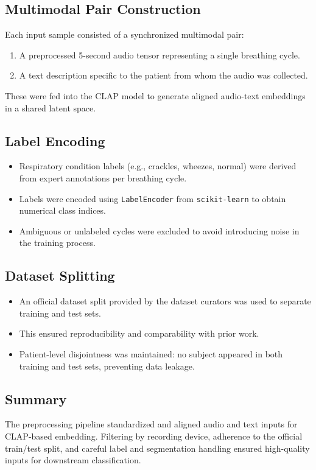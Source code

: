 \subsection{Multimodal Pair Construction}
Each input sample consisted of a synchronized multimodal pair:
\begin{enumerate}
    \item A preprocessed 5-second audio tensor representing a single breathing cycle.
    \item A text description specific to the patient from whom the audio was collected.
\end{enumerate}
These were fed into the CLAP model to generate aligned audio-text embeddings in a shared latent space.

\subsection{Label Encoding}
\begin{itemize}
    \item Respiratory condition labels (e.g., crackles, wheezes, normal) were derived from expert annotations per breathing cycle.
    \item Labels were encoded using \texttt{LabelEncoder} from \texttt{scikit-learn} to obtain numerical class indices.
    \item Ambiguous or unlabeled cycles were excluded to avoid introducing noise in the training process.
\end{itemize}

\subsection{Dataset Splitting}
\begin{itemize}
    \item An official dataset split provided by the dataset curators was used to separate training and test sets.
    \item This ensured reproducibility and comparability with prior work.
    \item Patient-level disjointness was maintained: no subject appeared in both training and test sets, preventing data leakage.
\end{itemize}

\subsection*{Summary}
The preprocessing pipeline standardized and aligned audio and text inputs for CLAP-based embedding. Filtering by recording device, adherence to the official train/test split, and careful label and segmentation handling ensured high-quality inputs for downstream classification.
